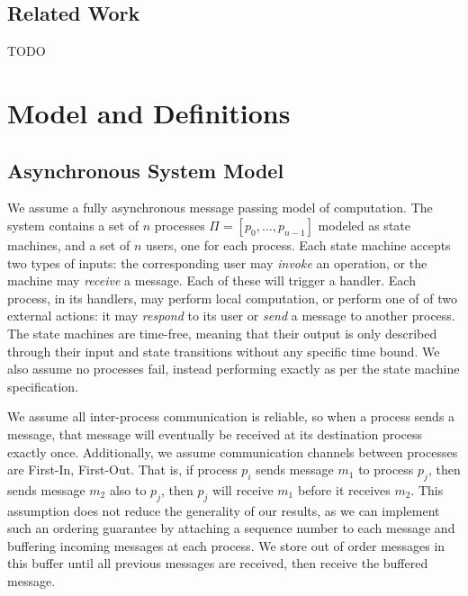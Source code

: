 \documentclass[a4paper,USenglish]{lipics-v2021} %
\begin{document}
\subsection{Related Work}

TODO




\section{Model and Definitions}

\subsection{Asynchronous System Model}
We assume a fully asynchronous message passing model of computation.  The system contains a set of $n$ processes $\Pi = [p_0, \dots , p_{n-1}]$ modeled as state machines, and a set of $n$ users, one for each process.  Each state machine accepts two types of inputs: the corresponding user may \emph{invoke} an operation, or the machine may \emph{receive} a message.  Each of these will trigger a handler.  Each process, in its handlers, may perform local computation, or perform one of of two external actions: it may \emph{respond} to its user or \emph{send} a message to another process.  The state machines are time-free, meaning that their output is only described through their input and state transitions without any specific time bound.  We also assume no processes fail, instead performing exactly as per the state machine specification.  

We assume all inter-process communication is reliable, so when a process sends a message, that message will eventually be received at its destination process exactly once.  Additionally, we assume communication channels between processes are First-In, First-Out.  That is, if process $p_i$ sends message $m_1$ to process $p_j$, then sends message $m_2$ also to $p_j$, then $p_j$ will receive $m_1$ before it receives $m_2$.  This assumption does not reduce the generality of our results, as we can implement such an ordering guarantee by attaching a sequence number to each message and buffering incoming messages at each process.  We store out of order messages in this buffer until all previous messages are received, then receive the buffered message.
\end{document}
